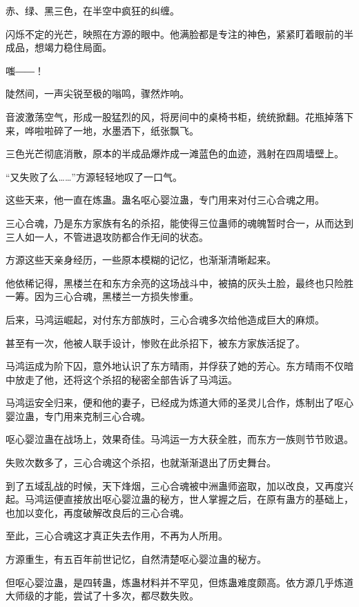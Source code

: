 
\begin{this_body}

赤、绿、黑三色，在半空中疯狂的纠缠。

闪烁不定的光芒，映照在方源的眼中。他满脸都是专注的神色，紧紧盯着眼前的半成品，想竭力稳住局面。

嗤――！

陡然间，一声尖锐至极的嗡鸣，骤然炸响。

音波激荡空气，形成一股猛烈的风，将房间中的桌椅书柜，统统掀翻。花瓶掉落下来，哗啦啦碎了一地，水墨洒下，纸张飘飞。

三色光芒彻底消散，原本的半成品爆炸成一滩蓝色的血迹，溅射在四周墙壁上。

“又失败了么……”方源轻轻地叹了一口气。

这些天来，他一直在炼蛊。蛊名呕心婴泣蛊，专门用来对付三心合魂之用。

三心合魂，乃是东方家族有名的杀招，能使得三位蛊师的魂魄暂时合一，从而达到三人如一人，不管进退攻防都合作无间的状态。

方源这些天亲身经历，一些原本模糊的记忆，也渐渐清晰起来。

他依稀记得，黑楼兰在和东方余亮的这场战斗中，被搞的灰头土脸，最终也只险胜一筹。因为三心合魂，黑楼兰一方损失惨重。

后来，马鸿运崛起，对付东方部族时，三心合魂多次给他造成巨大的麻烦。

甚至有一次，他被人联手设计，惨败在此杀招下，被东方家族活捉了。

马鸿运成为阶下囚，意外地认识了东方晴雨，并俘获了她的芳心。东方晴雨不仅暗中放走了他，还将这个杀招的秘密全部告诉了马鸿运。

马鸿运安全归来，便和他的妻子，已经成为炼道大师的圣灵儿合作，炼制出了呕心婴泣蛊，专门用来克制三心合魂。

呕心婴泣蛊在战场上，效果奇佳。马鸿运一方大获全胜，而东方一族则节节败退。

失败次数多了，三心合魂这个杀招，也就渐渐退出了历史舞台。

到了五域乱战的时候，天下烽烟，三心合魂被中洲蛊师盗取，加以改良，又再度兴起。马鸿运便直接放出呕心婴泣蛊的秘方，世人掌握之后，在原有蛊方的基础上，也加以变化，再度破解改良后的三心合魂。

至此，三心合魂这才真正失去作用，不再为人所用。

方源重生，有五百年前世记忆，自然清楚呕心婴泣蛊的秘方。

但呕心婴泣蛊，是四转蛊，炼蛊材料并不罕见，但炼蛊难度颇高。依方源几乎炼道大师级的才能，尝试了十多次，都尽数失败。


\end{this_body}
